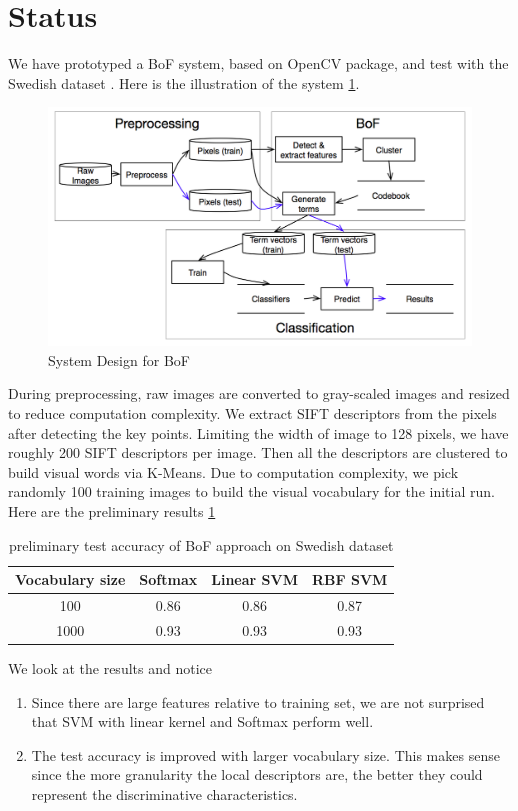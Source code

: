 \documentclass{article}
\begin{document}
\section{Status}
We have prototyped a BoF system, based on OpenCV package, and test with the Swedish dataset \cite{SwedishLeafDataset}. Here is the illustration of the system \ref{fig:bofsystemdesign}.
\begin{figure} 
  \centering
  \includegraphics[width=\textwidth]{flowchart}
  \caption{ System Design for BoF }
  \label{fig:bofsystemdesign}
\end{figure}
During preprocessing, raw images are converted to gray-scaled images and resized to reduce computation complexity. We extract SIFT descriptors from the pixels after detecting the key points. Limiting the width of image to 128 pixels, we have roughly 200 SIFT descriptors per image. Then all the descriptors are clustered to build visual words via K-Means. Due to computation complexity, we pick randomly 100 training images to build the visual vocabulary for the initial run.  Here are the preliminary results \ref{table:prelimaryresult}
\begin{table}
  \caption {preliminary test accuracy of BoF approach on Swedish dataset}
  \centering
  \begin{tabular} { c c c c}
    \hline\hline
    Vocabulary size & Softmax &  Linear SVM  & RBF SVM \\
    \hline
    100  &  0.86 & 0.86 & 0.87\\
    1000 &  0.93 & 0.93 & 0.93 \\
    \hline
  \end{tabular}
  \label{table:prelimaryresult}
\end{table}


We look at the results and notice
\begin{enumerate}
  \item Since there are large features relative to training set, we are not surprised that SVM with linear kernel and Softmax perform well. 
  \item The test accuracy is improved with larger vocabulary size. This makes sense since the more granularity the local descriptors are, the better they could represent the discriminative characteristics.
\end{enumerate}
\end{document}
